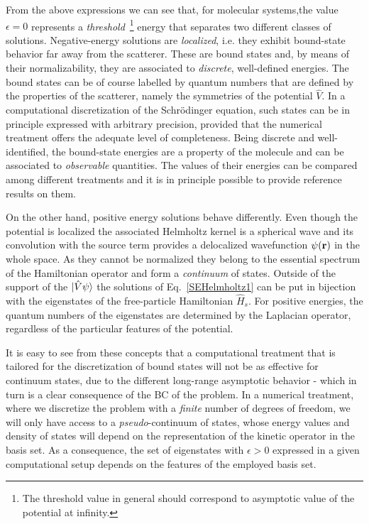 \documentclass[reprint,aps,prb]{revtex4-1}
\renewcommand{\r}{{\bf r}}
\newcommand{\op}[1]{\hat {#1}}
\begin{document}
From the above expressions we can see that, for molecular systems,the value $\epsilon=0$
represents a \emph{threshold}~\footnote{The threshold value in general should correspond to asymptotic value of the potential at infinity.}
energy that separates two different classes of solutions.
Negative-energy solutions are \emph{localized}, i.e. they exhibit bound-state behavior far away from the scatterer.
These are bound states and, by means of their normalizability, they are associated to \emph{discrete}, well-defined energies.
The bound states can be of course labelled by quantum numbers that are defined by the properties of the scatterer, namely the
symmetries of the potential $\op V$.
In a computational discretization of the Schr\"odinger equation, such states can be in principle expressed with arbitrary precision,
provided that the numerical treatment offers the adequate level of completeness.
Being discrete and well-identified, the bound-state energies are a property of the molecule and can be associated to \emph{observable}
quantities. The values of their energies can be compared among different treatments and it is in principle possible to
provide reference results on them.

On the other hand, positive energy solutions behave differently. Even though the potential is localized the associated Helmholtz kernel is a spherical wave and its convolution with the source term provides a delocalized wavefunction $\psi(\r)$ in the whole space.
As they cannot be normalized they belong to the essential spectrum of the Hamiltonian operator and form a \emph{continuum} of states.
Outside of the support of the $\ket{\op V \psi}$ the solutions of Eq.~\eqref{SEHelmholtz1} can be put in bijection with the eigenstates of the
free-particle Hamiltonian $\op H_s$. For positive energies, the quantum numbers of the eigenstates are determined by the Laplacian operator,
regardless of the particular features of the potential.

It is easy to see from these concepts that a computational treatment that is tailored for the discretization of bound states
will not be as effective for continuum states, due to the different long-range asymptotic behavior - which in turn is a clear consequence of the
BC of the problem. In a numerical treatment, where we discretize the problem with a \emph{finite}
number of degrees of freedom, we will only have access to a \emph{pseudo}-continuum of states,
whose energy values and density of states will depend on the representation of the kinetic operator
in the basis set. As a consequence, the set of eigenstates with $\epsilon > 0$ expressed in a given computational setup depends on the features of the employed basis set.
\end{document}
